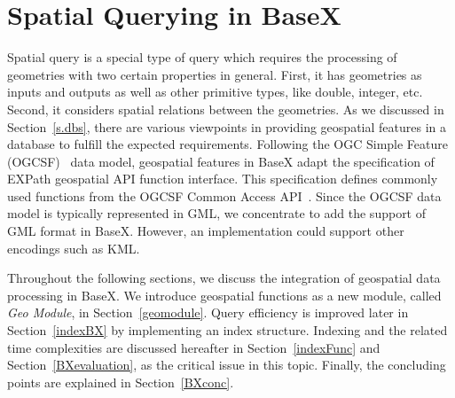 \documentclass[a4paper,12pt]{article}
\begin{document}
\section{Spatial Querying in BaseX}
\label{s.basex}
Spatial query is a special type of query which requires the processing of geometries with two certain properties in general. First, it has geometries as inputs and outputs as well as other primitive types, like double, integer, etc. Second, it considers spatial relations between the geometries.
As we discussed in Section~\ref{s.dbs}, there are various viewpoints in providing geospatial features in a database to fulfill the expected requirements. Following the OGC Simple Feature (OGCSF)~\cite{springergeo} data model, geospatial features in BaseX adapt the specification of EXPath geospatial API function interface. This specification defines commonly used functions from the OGCSF Common Access API~\cite{simpleFeature}. Since the OGCSF data model is typically represented in GML, we concentrate to add the support of GML format in BaseX. However, an implementation could support other encodings such as KML. 

Throughout the following sections, we discuss the integration of geospatial data processing in BaseX. We introduce geospatial functions as a new module, called \textit{Geo Module}, in Section~\ref{geomodule}. Query efficiency is improved later in Section~\ref{indexBX} by implementing an index structure. Indexing and the related time complexities are discussed hereafter in Section~\ref{indexFunc} and Section~\ref{BXevaluation}, as the critical issue in this topic. Finally, the concluding points are explained in Section~\ref{BXconc}.
\end{document}
